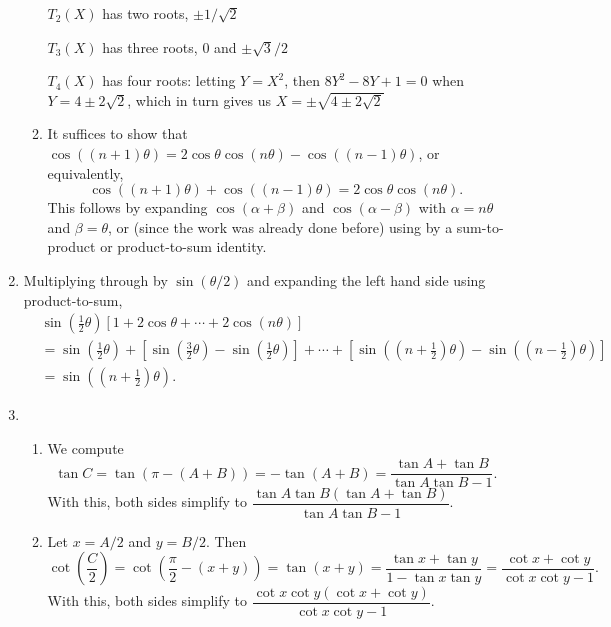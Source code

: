 \begin{enumerate}
\begin{enumerate}
$T_2(X)$ has two roots, $\pm 1/\sqrt{2}$\par
$T_3(X)$ has three roots, $0$ and $\pm\sqrt{3}/2$\par
$T_4(X)$ has four roots: letting $Y = X^2$, then $8Y^2 - 8Y + 1 = 0$ when $Y = 4\pm 2\sqrt{2}$, which in turn gives us $X = \pm\sqrt{4\pm 2\sqrt{2}}$
\item It suffices to show that $\cos((n + 1)\theta) = 2\cos\theta\cos(n\theta) - \cos((n - 1)\theta)$, or equivalently,
\begin{equation*}
\cos((n + 1)\theta) + \cos((n - 1)\theta) = 2\cos\theta\cos(n\theta).
\end{equation*}
This follows by expanding $\cos(\alpha + \beta)$ and $\cos(\alpha - \beta)$ with $\alpha = n\theta$ and $\beta = \theta$, or (since the work was already done before) using by a sum-to-product or product-to-sum identity.
\end{enumerate}
\item Multiplying through by $\sin(\theta/2)$ and expanding the left hand side using product-to-sum,
\begin{align*}
& \sin\left(\frac{1}{2}\theta\right)\left[1 + 2\cos\theta + \cdots + 2\cos (n\theta)\right] \\
&= \sin\left(\frac{1}{2}\theta\right) + \left[\sin\left(\frac{3}{2}\theta\right) - \sin\left(\frac{1}{2}\theta\right)\right] + \cdots + \left[\sin\left(\left(n + \frac{1}{2}\right)\theta\right) - \sin\left(\left(n - \frac{1}{2}\right)\theta\right)\right] \\
&= \sin\left(\left(n + \frac{1}{2}\right)\theta\right).
\end{align*}
\item \begin{enumerate}
\item We compute
\begin{equation*}
\tan C = \tan(\pi - (A + B)) = -\tan(A + B) = \frac{\tan A + \tan B}{\tan A\tan B - 1}.
\end{equation*}
With this, both sides simplify to $\dfrac{\tan A\tan B(\tan A + \tan B)}{\tan A\tan B - 1}$.
\item Let $x = A/2$ and $y = B/2$. Then
\begin{equation*}
\cot\left(\frac{C}{2}\right) = \cot\left(\frac{\pi}{2} - (x + y)\right) = \tan(x + y) = \frac{\tan x + \tan y}{1 - \tan x\tan y} = \frac{\cot x + \cot y}{\cot x\cot y - 1}.
\end{equation*}
With this, both sides simplify to $\dfrac{\cot x\cot y(\cot x + \cot y)}{\cot x\cot y - 1}$.

\end{enumerate}
\end{enumerate}

